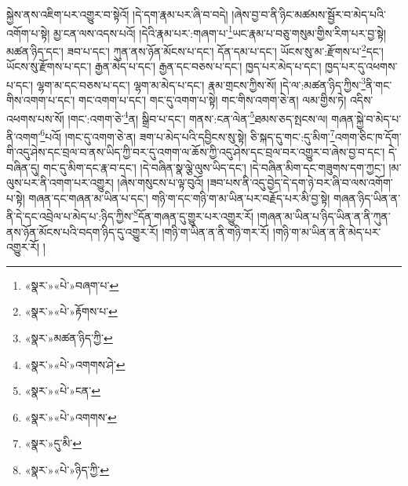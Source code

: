 སྐྱེས་ནས་འཇིག་པར་འགྱུར་བ་སྟེའོ། །དེ་དག་རྣམ་པར་ཞི་བ་བདེ། །ཞེས་བྱ་བ་ནི་ཉིང་མཚམས་སྦྱོར་བ་མེད་པའི་འགོག་པ་སྟེ། མྱ་ངན་ལས་འདས་པའོ། །དེའི་རྣམ་པར་:གཞག་པ་\footnote{«སྣར་»«པེ་»བཞག་པ་}ཡང་རྣམ་པ་བཅུ་གསུམ་གྱིས་རིག་པར་བྱ་སྟེ། མཚན་ཉིད་དང་། ཟབ་པ་དང་། ཀུན་ནས་ཉོན་མོངས་པ་དང་། དོན་དམ་པ་དང་། ཡོངས་སུ་མ་:རྫོགས་པ་\footnote{«སྣར་»«པེ་»རྟོགས་པ་}དང་། ཡོངས་སུ་རྫོགས་པ་དང་། རྒྱན་མེད་པ་དང་། རྒྱན་དང་བཅས་པ་དང་། ཁྱད་པར་མེད་པ་དང་། ཁྱད་པར་དུ་འཕགས་པ་དང་། ལྷག་མ་དང་བཅས་པ་དང་། ལྷག་མ་མེད་པ་དང་། རྣམ་གྲངས་ཀྱིས་སོ། །དེ་ལ་:མཚན་ཉིད་ཀྱིས་\footnote{«སྣར་»མཚན་ཉིད་ཀྱི་}ནི་གང་གིས་འགག་པ་དང་། གང་འགག་པ་དང་། གང་དུ་འགག་པ་སྟེ། གང་གིས་འགག་ཅེ་ན། ལམ་གྱིས་ཏེ། འདིས་འཕགས་པས་སོ། །གང་:འགག་ཅེ་\footnote{«སྣར་»«པེ་»འགགས་ཤེ་}ན། སྒྲིབ་པ་དང་། གནས་:ངན་ལེན་\footnote{«སྣར་»«པེ་»ངན་}ཐམས་ཅད་སྤངས་ལ། གཞན་སྐྱེ་བ་མེད་པ་ནི་འགག་\footnote{«སྣར་»«པེ་»འགགས་}པའོ། །གང་དུ་འགག་ཅེ་ན། ཟག་པ་མེད་པའི་དབྱིངས་སུ་སྟེ། ཅི་སྐད་དུ་གང་:དུ་མིག་\footnote{«སྣར་»དུ་མི་}འགག་ཅིང་ཁ་དོག་གི་འདུ་ཤེས་དང་བྲལ་བ་ནས་ཡིད་ཀྱི་བར་དུ་འགག་ལ་ཆོས་ཀྱི་འདུ་ཤེས་དང་བྲལ་བར་འགྱུར་བ་ཞེས་བྱ་བ་དང་། དེ་བཞིན་དུ། གང་དུ་མིག་དང་རྣ་བ་དང་། །དེ་བཞིན་སྣ་ལྕེ་ལུས་ཡིད་དང་། །དེ་བཞིན་མིག་དང་གཟུགས་དག་ཀྱང་། །མ་ལུས་པར་ནི་འགག་པར་འགྱུར། །ཞེས་གསུངས་པ་ལྟ་བུའོ། །ཟབ་པས་ནི་འདུ་བྱེད་དེ་དག་ཉེ་བར་ཞི་བ་ལས་འགོག་པ་སྟེ། གཞན་དང་གཞན་མ་ཡིན་པ་དང་། གཉི་ག་དང་གཉི་ག་མ་ཡིན་པར་བརྗོད་པར་མི་བྱ་སྟེ། གཞན་ཉིད་ཡིན་ན་ནི་དེ་དང་འབྲེལ་པ་མེད་པ་:ཉིད་ཀྱིས་\footnote{«སྣར་»«པེ་»ཉིད་ཀྱི་}དོན་གཞན་དུ་གྱུར་པར་འགྱུར་རོ། །གཞན་མ་ཡིན་པ་ཉིད་ཡིན་ན་ནི་ཀུན་ནས་ཉོན་མོངས་པའི་བདག་ཉིད་དུ་འགྱུར་རོ། །གཉི་ག་ཡིན་ན་ནི་གཉི་གར་རོ། །གཉི་ག་མ་ཡིན་ན་ནི་མེད་པར་འགྱུར་རོ། །
